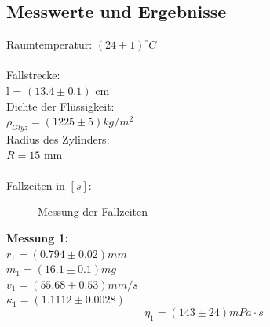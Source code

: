 \documentclass[12pt,a4paper]{article}
\begin{document}
\begin{multicols}{2}
\subsection{Messwerte und Ergebnisse}
Raumtemperatur: $(24 \pm 1)^{\circ}C$\\
\\
Fallstrecke: \\
\indent l = $(13.4 \pm 0.1)$ cm\\
\noindent Dichte der Flüssigkeit: \\
\indent $\rho_{Glyz} = (1225 \pm 5) kg/m^2$\\
Radius des Zylinders:\\
\indent$R=15$ mm\\
\\
Fallzeiten in $[s]$:
\begin{figure}[H]
	\centering
	\caption{Messung der Fallzeiten}
	\label{fig:visko_fallzeit}
\end{figure}
\noindent

\noindent



\textbf{Messung 1:}\\
$r_1 = (0.794 \pm 0.02) mm$\\
$m_1 = (16.1 \pm 0.1) mg$\\
$v_1 = (55.68 \pm 0.53)mm/s$\\
$\kappa_1 =  %
(1.1112\pm 0.0028)$\\
$$\eta_1 = %
(143 \pm 24) mPa \cdot s$$
\\
\noindent




\end{multicols}
\end{document}

